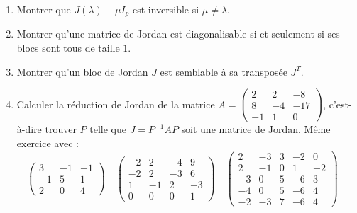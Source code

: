 \documentclass[12pt, class=report,crop=false]{standalone}
\begin{document}
 
\begin{miniexercices}
\sauteligne
\begin{enumerate}
  \item Montrer que $J(\lambda)-\mu I_p$ est inversible si $\mu \neq \lambda$.
  
  \item Montrer qu'une matrice de Jordan est diagonalisable 
  si et seulement si ses blocs sont tous de taille $1$.
  
  \item Montrer qu'un bloc de Jordan $J$ est semblable à sa transposée $J^T$.

  \item Calculer la réduction de Jordan de la matrice 
  $A = \left(\begin{smallmatrix}
  2 & 2 & -8 \\8 & -4 & -17 \\-1 & 1 & 0 \end{smallmatrix}\right)$, 
  c'est-à-dire trouver $P$ telle que $J = P^{-1}AP$ soit une matrice de Jordan.
  Même exercice avec :
  $$
  \left(\begin{smallmatrix} 
  3 & -1 & -1 \\ -1 & 5 & 1 \\ 2 & 0 & 4
  \end{smallmatrix}\right) \quad
  \left(\begin{smallmatrix} 
  -2 & 2 & -4 & 9 \\ -2 & 2 & -3 & 6 \\ 1 & -1 & 2 & -3 \\ 0 & 0 & 0 & 1
  \end{smallmatrix}\right) \quad
  \left(\begin{smallmatrix} 
  2 & -3 & 3 & -2 & 0 \\
  2 & -1 & 0 & 1 & -2 \\
  -3 & 0 & 5 & -6 & 3 \\
  -4 & 0 & 5 & -6 & 4 \\
  -2 & -3 & 7 & -6 & 4
  \end{smallmatrix}\right) \quad
  $$
  
    
  
  
\end{enumerate}
\end{miniexercices}








\finchapitre 
\end{document}
